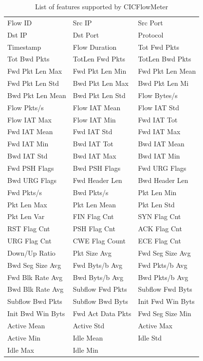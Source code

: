 \documentclass[conference]{IEEEtran}
\begin{document}
\begin{table}[htbp]
\caption{List of features supported by CICFlowMeter}
\begin{tabular}{| l l l |}
\hline
Flow ID & Src IP & Src Port \\
Dst IP & Dst Port & Protocol \\
Timestamp & Flow Duration & Tot Fwd Pkts \\
Tot Bwd Pkts & TotLen Fwd Pkts & TotLen Bwd Pkts \\
Fwd Pkt Len Max & Fwd Pkt Len Min & Fwd Pkt Len Mean \\
Fwd Pkt Len Std & Bwd Pkt Len Max & Bwd Pkt Len Mi \\
Bwd Pkt Len Mean & Bwd Pkt Len Std & Flow Bytes/s \\
Flow Pkts/s & Flow IAT Mean & Flow IAT Std \\
Flow IAT Max & Flow IAT Min & Fwd IAT Tot \\
Fwd IAT Mean & Fwd IAT Std & Fwd IAT Max \\
Fwd IAT Min & Bwd IAT Tot & Bwd IAT Mean \\
Bwd IAT Std & Bwd IAT Max & Bwd IAT Min \\
Fwd PSH Flags & Bwd PSH Flags & Fwd URG Flags \\
Bwd URG Flags & Fwd Header Len & Bwd Header Len \\
Fwd Pkts/s & Bwd Pkts/s & Pkt Len Min \\
Pkt Len Max & Pkt Len Mean & Pkt Len Std \\
Pkt Len Var & FIN Flag Cnt & SYN Flag Cnt \\
RST Flag Cnt & PSH Flag Cnt & ACK Flag Cnt \\
URG Flag Cnt & CWE Flag Count & ECE Flag Cnt \\
Down/Up Ratio & Pkt Size Avg & Fwd Seg Size Avg \\
Bwd Seg Size Avg & Fwd Byts/b Avg & Fwd Pkts/b Avg \\
Fwd Blk Rate Avg & Bwd Byts/b Avg & Bwd Pkts/b Avg \\
Bwd Blk Rate Avg & Subflow Fwd Pkts & Subflow Fwd Byts \\
Subflow Bwd Pkts & Subflow Bwd Byts & Init Fwd Win Byts \\
Init Bwd Win Byts & Fwd Act Data Pkts & Fwd Seg Size Min \\
Active Mean & Active Std & Active Max \\
Active Min & Idle Mean & Idle Std \\
Idle Max & Idle Min & \\
\hline
\end{tabular}
\label{table:cicflowmeter_features}
\end{table}
\end{document}
